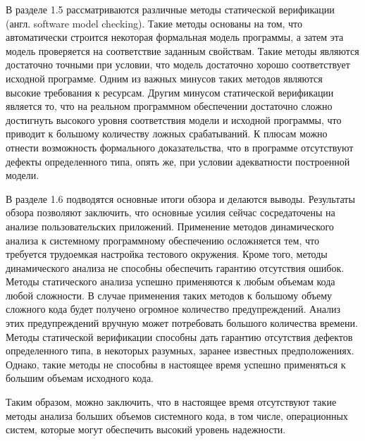 В разделе 1.5 рассматриваются различные методы статической верификации (англ. software model checking).
Такие методы основаны на том, что автоматически строится некоторая формальная модель программы, а затем эта модель проверяется на соответствие заданным свойствам.
Такие методы являются достаточно точными при условии, что модель достаточно хорошо соответствует исходной программе.
Одним из важных минусов таких методов являются высокие требования к ресурсам.
Другим минусом статической верификации является то, что на реальном программном обеспечении достаточно сложно достигнуть высокого уровня соответствия модели и исходной программы, что приводит к большому количеству ложных срабатываний.
К плюсам можно отнести возможность формального доказательства, что в программе отсутствуют дефекты определенного типа, опять же, при условии адекватности построенной модели.

В разделе 1.6 подводятся основные итоги обзора и делаются выводы.
Результаты обзора позволяют заключить, что основные усилия сейчас сосредаточены на анализе пользовательских приложений.
Применение методов динамического анализа к системному программному обеспечению осложняется тем, что требуется трудоемкая настройка тестового окружения.
Кроме того, методы динамического анализа не способны обеспечить гарантию отсутствия ошибок.
Методы статического анализа успешно применяются к любым объемам кода любой сложности. 
В случае применения таких методов к большому объему сложного кода будет получено огромное количество предупреждений.
Анализ этих предупреждений вручную может потребовать большого количества времени.
Методы статической верификации способны дать гарантию отсутствия дефектов определенного типа, в некоторых разумных, заранее известных предположениях.
Однако, такие методы не способны в настоящее время успешно применяться к большим объемам исходного кода.

Таким образом, можно заключить, что в настоящее время отсутствуют такие методы анализа больших объемов системного кода, в том числе, операционных систем, которые могут обеспечить высокий уровень надежности.

